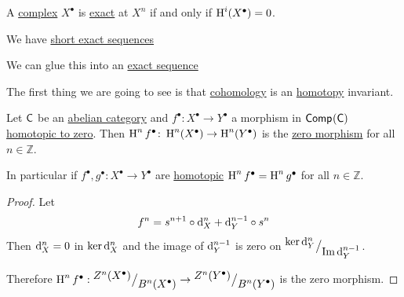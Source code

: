 \documentclass[../../main]{subfiles}
\begin{document}
\begin{remark}
  A \hyperref[def:complex]{complex} \(X^{\bullet}\) is \hyperref[def:exact-sequence]{exact} at \(X^{n}\) if and only if \(\operatorname{H}^{i}(X^{\bullet}) = 0\).
\end{remark}

\begin{remark}\label{rem:short-exact-sequence-cohomology}
  We have \hyperref[def:exact-sequence]{short exact sequences}
  \begin{center}
  \end{center}

  We can glue this into an \hyperref[def:exact-sequence]{exact sequence}
  \begin{center}
  \end{center}
\end{remark}

The first thing we are going to see is that \hyperref[def:cohomology]{cohomology} is an \hyperref[def:homotopy]{homotopy} invariant.
\begin{lemma}\label{lemma:extension-cohomology-homotopy}
  Let \(\mathsf{C}\) be an \hyperref[def:abelian-category]{abelian category} and \(f^{\bullet}\colon X^{\bullet} \to Y^{\bullet}\) a morphism in \(\mathsf{Comp}^{}(\mathsf{C})\) \hyperref[def:homotopy]{homotopic to zero}.
  Then \(\operatorname{H}^{n}f^{\bullet}\colon \operatorname{H}^{n}(X^{\bullet}) \to \operatorname{H}^{n}(Y^{\bullet})\) is the \hyperref[def:zero-object]{zero morphism} for all \(n \in \mathbb{Z}\).

  In particular if \(f^{\bullet}, g^{\bullet}: X^{\bullet} \to Y^{\bullet}\) are \hyperref[def:homotopy]{homotopic} \(\operatorname{H}^{n}f^{\bullet} = \operatorname{H}^{n}g^{\bullet}\) for all \(n \in \mathbb{Z}\).
\end{lemma}
\begin{proof}
  Let
  \begin{equation*}
    f^{n} = s^{n+1} \circ \mathrm{d}_{X}^{n} + \mathrm{d}_{Y}^{n-1} \circ s^{n}
  \end{equation*}
  Then \(\mathrm{d}_{X}^{n} = 0\) in \(\ker \mathrm{d}_{X}^{n}\) and the image of \(\mathrm{d}_{Y}^{n-1}\) is zero on \({^{\textstyle \ker \mathrm{d}_{Y}^{n}}\big/_{\textstyle \operatorname{Im} \mathrm{d}_{Y}^{n-1}}}\).
  
  Therefore \(\operatorname{H}^{n}f^{\bullet}: {^{\textstyle Z^{n}(X^{\bullet})}\big/_{\textstyle B^{n}(X^{\bullet})}} \to {^{\textstyle Z^{n}(Y^{\bullet})}\big/_{\textstyle B^{n}(Y^{\bullet})}}\) is the zero morphism.
\end{proof}
\end{document}

